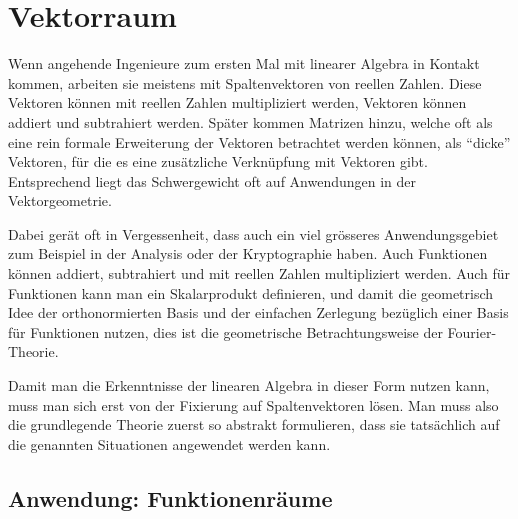 %
%
%
\chapter{Vektorraum%
\label{chapter:vektorraum}}
Wenn angehende Ingenieure zum ersten Mal mit linearer Algebra in
Kontakt kommen, arbeiten sie meistens mit Spaltenvektoren von
reellen Zahlen.
Diese Vektoren können mit reellen Zahlen multipliziert werden,
Vektoren können addiert und subtrahiert werden.
Später kommen Matrizen hinzu, welche oft als eine rein formale
Erweiterung der Vektoren betrachtet werden können, als ``dicke''
Vektoren, für die es eine zusätzliche Verknüpfung mit Vektoren
gibt.
Entsprechend liegt das Schwergewicht oft auf Anwendungen in der
Vektorgeometrie.

Dabei gerät oft in Vergessenheit, dass auch ein viel grösseres
Anwendungsgebiet zum Beispiel in der Analysis oder der Kryptographie
haben.
Auch Funktionen können addiert, subtrahiert und mit reellen Zahlen
multipliziert werden.
Auch für Funktionen kann man ein Skalarprodukt definieren, und
damit die geometrisch Idee der orthonormierten Basis und der
einfachen Zerlegung bezüglich einer Basis für Funktionen nutzen,
dies ist die geometrische Betrachtungsweise der Fourier-Theorie.

Damit man die Erkenntnisse der linearen Algebra in dieser Form
nutzen kann, muss man sich erst von der Fixierung auf Spaltenvektoren
lösen.
Man muss also die grundlegende Theorie zuerst so abstrakt formulieren,
dass sie tatsächlich auf die genannten Situationen angewendet werden 
kann.







\section{Anwendung: Funktionenräume}



